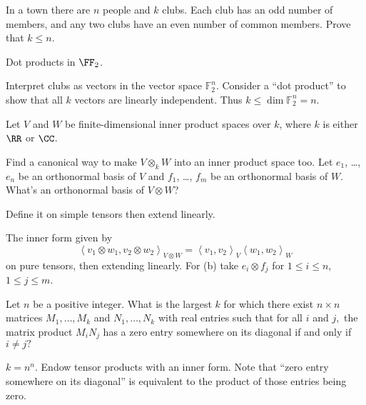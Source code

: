 \begin{problem}
	\gim
	In a town there are $n$ people and $k$ clubs. Each club has an odd number of members, and any two clubs have an even number of common members. Prove that $k \le n$.
	\begin{hint}
		Dot products in $\FF_2$.
	\end{hint}
	\begin{sol}
		Interpret clubs as vectors in the vector space $\mathbb F_2^n$.
		Consider a ``dot product'' to show that all $k$ vectors are linearly independent.
		Thus $k \le \dim \mathbb F_2^n = n$.
	\end{sol}
\end{problem}

\begin{sproblem}
	\label{prob:inner_prod_tensor}
	Let $V$ and $W$ be finite-dimensional inner product spaces over $k$,
	where $k$ is either $\RR$ or $\CC$.
	\begin{enumerate}[(a)]
		\ii Find a canonical way to make $V \otimes_k W$ into an inner product space too.
		\ii Let $e_1$, \dots, $e_n$ be an orthonormal basis of $V$
		and $f_1$, \dots, $f_m$ be an orthonormal basis of $W$.
		What's an orthonormal basis of $V \otimes W$?
	\end{enumerate}
	\begin{hint}
		Define it on simple tensors then extend linearly.
	\end{hint}
	\begin{sol}
		The inner form given by
		\[ \left< v_1 \otimes w_1 , v_2 \otimes w_2 \right>_{V \otimes W}
		= \left< v_1,v_2 \right>_V \left< w_1,w_2\right>_W \]
		on pure tensors, then extending linearly.
		For (b) take $e_i \otimes f_j$ for $1 \le i \le n$, $1 \le j \le m$.
	\end{sol}
\end{sproblem}


\begin{problem}[Putnam 2014]
	\gim
	Let $n$ be a positive integer. What is the largest $k$ for which there exist $n\times n$ matrices $M_1,\dots,M_k$ and $N_1,\dots,N_k$ with real entries such that for all $i$ and $j,$ the matrix product $M_iN_j$ has a zero entry somewhere on its diagonal if and only if $i\ne j?$
	\begin{hint}
		$k = n^n$.
		Endow tensor products with an inner form.
		Note that ``zero entry somewhere on its diagonal''
		is equivalent to the product of those entries being zero.
	\end{hint}
\end{problem}
